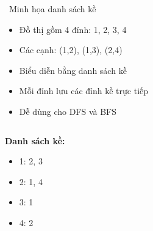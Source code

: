 \documentclass{beamer}
\begin{document}
\begin{frame}{\faProjectDiagram\ Minh họa danh sách kề}
\begin{tcolorbox}
\begin{itemize}
\item Đồ thị gồm 4 đỉnh: 1, 2, 3, 4
\item Các cạnh: (1,2), (1,3), (2,4)
\item Biểu diễn bằng danh sách kề
\item Mỗi đỉnh lưu các đỉnh kề trực tiếp
\item Dễ dùng cho DFS và BFS
\end{itemize}
\end{tcolorbox}

\vspace{0.3cm}

\begin{columns}
\centering
{}

\begin{tcolorbox}[colframe=softpurple!70!black]
\textbf{Danh sách kề:}
\begin{itemize}
\item 1: 2, 3
\item 2: 1, 4
\item 3: 1
\item 4: 2
\end{itemize}
\end{tcolorbox}

\end{columns}

\end{frame}
\end{document}
